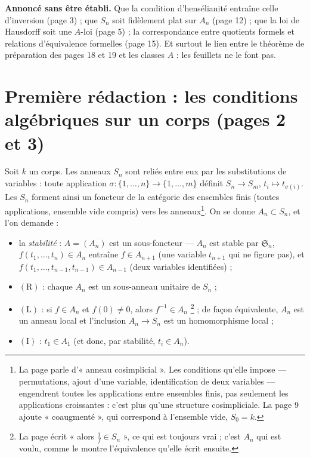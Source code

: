 \documentclass[11pt,a4paper]{article}
\begin{document}
\textbf{Annoncé sans être établi.} Que la condition
d'hensélianité entraîne celle d'inversion (page 3) ; que $S_n$ soit fidèlement
plat sur $A_n$ (page 12) ; que la loi de Hausdorff soit une $A$-loi (page 5) ;
la correspondance entre quotients formels et relations d'équivalence
formelles (page 15). Et surtout le lien entre le théorème de préparation des
pages 18 et 19 et les classes $A$ : les feuillets ne le font pas.

\section*{Première rédaction : les conditions algébriques sur un corps (pages 2 et 3)}

Soit $k$ un corps. Les anneaux $S_n$ sont reliés entre eux par les
substitutions de variables : toute application $\sigma : \{1, \ldots, n\} \to
\{1, \ldots, m\}$ définit $S_n \to S_m$, $t_i \mapsto t_{\sigma(i)}$. Les $S_n$
forment ainsi un foncteur de la catégorie des ensembles finis (toutes
applications, ensemble vide compris) vers les anneaux\footnote{La page parle
d'« anneau cosimplicial ». Les conditions qu'elle impose — permutations,
ajout d'une variable, identification de deux variables — engendrent toutes
les applications entre ensembles finis, pas seulement les applications
croissantes : c'est plus qu'une structure cosimpliciale. La page 9 ajoute
« coaugmenté », qui correspond à l'ensemble vide, $S_0 = k$.}. On se donne
$A_n \subset S_n$, et l'on demande :

\begin{itemize}
  \item la \emph{stabilité} : $A = (A_n)$ est un sous-foncteur — $A_n$ est
    stable par $\mathfrak{S}_n$, $f(t_1, \ldots, t_n) \in A_n$ entraîne
    $f \in A_{n+1}$ (une variable $t_{n+1}$ qui ne figure pas), et
    $f(t_1, \ldots, t_{n-1}, t_{n-1}) \in A_{n-1}$ (deux variables identifiées) ;
  \item $(\mathrm{R})$ : chaque $A_n$ est un sous-anneau unitaire de $S_n$ ;
  \item $(\mathrm{L})$ : si $f \in A_n$ et $f(0) \neq 0$, alors $f^{-1} \in A_n$
    \footnote{La page écrit « alors $\frac{1}{f} \in S_n$ », ce qui est toujours vrai
    ; c'est $A_n$ qui est voulu, comme le montre l'équivalence qu'elle écrit
    ensuite.} ;
    de façon équivalente, $A_n$ est un anneau local et l'inclusion
    $A_n \to S_n$ est un homomorphisme local ;
  \item $(\mathrm{I})$ : $t_1 \in A_1$ (et donc, par stabilité, $t_i \in A_n$).
\end{itemize}
\end{document}
